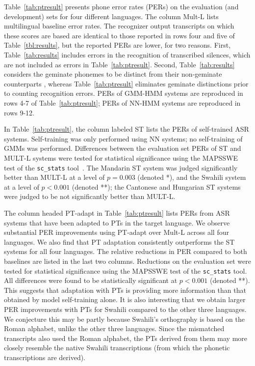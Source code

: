 Table~\ref{tab:ptresult} presents phone error rates (PERs) on the
evaluation (and development) sets for four different languages. The
column {\sc Mult-L} lists multilingual baseline error rates.  The
recognizer output transcripts on which these scores are based are
identical to those reported in rows four and five of
Table~\ref{tbl:results}, but the reported PERs are lower, for two
reasons.  First, Table~\ref{tab:results} includes errors in the
recognition of transcribed silences, which are not included as errors
in Table~\ref{tab:ptresult}.  Second, Table~\ref{tab:results}
considers the geminate phonemes \ipa{[a:,i:,u:,n:,k:,S:]} to be
distinct from their non-geminate counterparts \ipa{[a,i,u,n,k,S]},
whereas Table~\ref{tab:ptresult} eliminates geminate distinctions
prior to counting recognition errors.  PERs of GMM-HMM systems are
reproduced in rows 4-7 of Table~\ref{tab:ptresult}; PERs of NN-HMM
systems are reproduced in rows 9-12.

In Table~\ref{tab:ptresult}, the column labeled {\sc ST} lists the
PERs of self-trained ASR systems. Self-training was only performed
using NN systems; no self-training of GMMs was performed.  Differences
between the evaluation set PERs of {\sc ST} and {\sc MULT-L} systems
were tested for statistical significance using the MAPSSWE test of the
{\tt sc\_stats} tool~\cite{Pallet90}.  The Mandarin {\sc ST} system
was judged significantly better than {\sc MULT-L} at a level of
$p=0.003$ (denoted *), and the Swahili system at a level of $p<0.001$
(denoted **); the Cantonese and Hungarian {\sc ST} systems were judged
to be not significantly better than {\sc MULT-L}.

The column headed {\sc PT-adapt} in Table~\ref{tab:ptresult} lists
PERs from ASR systems that have been adapted to PTs in the target
language. We observe substantial PER improvements using {\sc PT-adapt}
over {\sc Mult-L} across all four languages. We also find that PT
adaptation consistently outperforms the {\sc ST} systems for all four
languages. The relative reductions in PER compared to both baselines
are listed in the last two columns.  Reductions on the evaluation set
were tested for statistical significance using the MAPSSWE test of the
{\tt sc\_stats} tool.  All differences were found to be statistically
significant at $p<0.001$ (denoted **).  This suggests that adaptation
with PTs is providing more information than that obtained by model
self-training alone. It is also interesting that we obtain larger PER
improvements with PTs for Swahili compared to the other three
languages. We conjecture this may be partly because Swahili's
orthography is based on the Roman alphabet, unlike the other three
languages. Since the mismatched transcripts also used the Roman
alphabet, the PTs derived from them may more closely resemble the
native Swahili transcriptions (from which the phonetic transcriptions
are derived).

